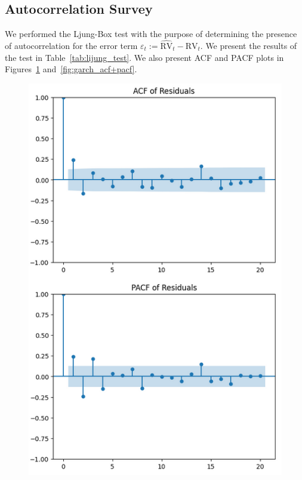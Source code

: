 \subsection{Autocorrelation Survey}
We performed the Ljung-Box test with the purpose of determining the presence of autocorrelation for the error term \(\varepsilon_t := \widehat{\text{RV}}_t - \text{RV}_t\). We present the results of the test in Table~\ref{tab:lijung_test}. We also present ACF and PACF plots in Figures~\ref{fig:har_acf+pacf} and~\ref{fig:garch_acf+pacf}.



\begin{figure}[]
\centering
\begin{minipage}{.5\textwidth}
  \centering
  \includegraphics[width=.9\linewidth]{img/har_acf+pacf.png}
  \label{fig:har_acf+pacf}
\end{minipage}%

\end{figure}
